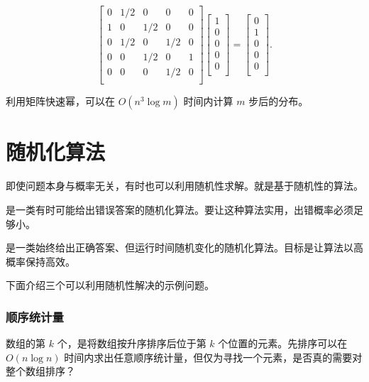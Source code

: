 \[ 
 \begin{bmatrix}
  0 & 1/2 & 0 & 0 & 0 \\
  1 & 0 & 1/2 & 0 & 0 \\
  0 & 1/2 & 0 & 1/2 & 0 \\
  0 & 0 & 1/2 & 0 & 1 \\
  0 & 0 & 0 & 1/2 & 0 \\
 \end{bmatrix}
 \begin{bmatrix}
  1 \\
  0 \\
  0 \\
  0 \\
  0 \\
 \end{bmatrix}
=
 \begin{bmatrix}
  0 \\
  1 \\
  0 \\
  0 \\
  0 \\
 \end{bmatrix}.
\]

利用矩阵快速幂，可以在 $O(n^3 \log m)$ 时间内计算 $m$ 步后的分布。

\section{随机化算法}


即使问题本身与概率无关，有时也可以利用随机性求解。就是基于随机性的算法。


是一类有时可能给出错误答案的随机化算法。要让这种算法实用，出错概率必须足够小。


是一类始终给出正确答案、但运行时间随机变化的随机化算法。目标是让算法以高概率保持高效。

下面介绍三个可以利用随机性解决的示例问题。

\subsubsection{顺序统计量}


数组的第 $k$ 个，是将数组按升序排序后位于第 $k$ 个位置的元素。先排序可以在 $O(n\log n)$ 时间内求出任意顺序统计量，但仅为寻找一个元素，是否真的需要对整个数组排序？

